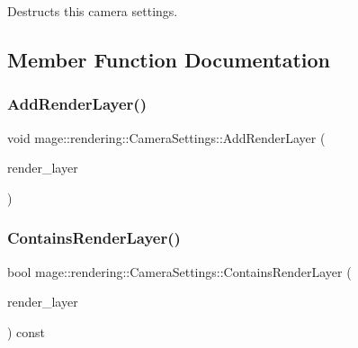 Destructs this camera settings. 

\subsection{Member Function Documentation}
\mbox{\label{classmage_1_1rendering_1_1_camera_settings_a921ff9ebe3ff05890f0e3dd8b71fcb7f}} 
\subsubsection{\texorpdfstring{Add\+Render\+Layer()}{AddRenderLayer()}}
{\footnotesize\ttfamily void mage\+::rendering\+::\+Camera\+Settings\+::\+Add\+Render\+Layer (\begin{DoxyParamCaption}\item[{\mbox{\hyperlink{namespacemage_1_1rendering_a466c2a441ea5b26e4625c2f34e021b3d}{Render\+Layer}}}]{render\+\_\+layer }\end{DoxyParamCaption})\hspace{0.3cm}{\ttfamily [noexcept]}}

\mbox{\label{classmage_1_1rendering_1_1_camera_settings_aab59f8b20a5d05fd23fff006ef741dac}} 
\subsubsection{\texorpdfstring{Contains\+Render\+Layer()}{ContainsRenderLayer()}}
{\footnotesize\ttfamily bool mage\+::rendering\+::\+Camera\+Settings\+::\+Contains\+Render\+Layer (\begin{DoxyParamCaption}\item[{\mbox{\hyperlink{namespacemage_1_1rendering_a466c2a441ea5b26e4625c2f34e021b3d}{Render\+Layer}}}]{render\+\_\+layer }\end{DoxyParamCaption}) const\hspace{0.3cm}{\ttfamily [noexcept]}}

